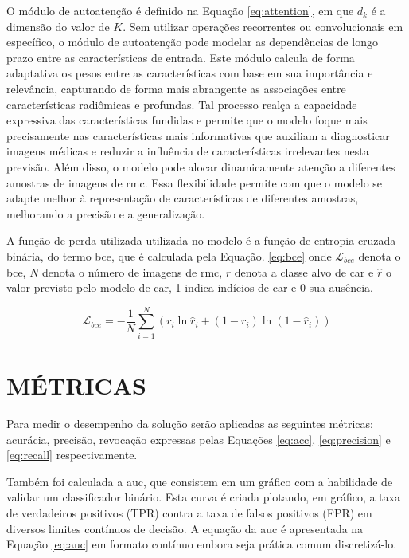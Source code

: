 O módulo de autoatenção é definido na Equação \ref{eq:attention}, em que $d_{k}$ é a dimensão do valor de $K$. Sem utilizar operações recorrentes ou convolucionais em específico, o módulo de autoatenção pode modelar as dependências de longo prazo entre as características de entrada.
Este módulo calcula de forma adaptativa os pesos entre as características com base em sua importância e relevância, capturando de forma mais abrangente as associações entre características radiômicas e profundas. Tal processo realça a capacidade expressiva das características fundidas e permite que o modelo foque mais precisamente nas características mais informativas que auxiliam a diagnosticar imagens médicas e reduzir a influência de características irrelevantes nesta previsão. Além disso, o modelo pode alocar dinamicamente atenção a diferentes amostras de imagens de \gls{rmc}. Essa flexibilidade permite com que o modelo se adapte melhor à representação de características de diferentes amostras, melhorando a precisão e a generalização.

A função de perda utilizada utilizada no modelo é a função de entropia cruzada binária, do termo  \gls{bce}, que é calculada pela Equação. \ref{eq:bce} onde $\mathcal{L}_{bce}$ denota o \gls{bce}, $N$ denota o número de imagens de \gls{rmc}, $r$ denota a classe alvo de \gls{car} e $\hat{r}$ o valor previsto pelo modelo de \gls{car}, 1 indica indícios de \gls{car} e 0 sua ausência.

\begin{equation}
\mathcal{L}_{bce} = -\frac{1}{N} \sum_{i=1}^N
(r_i \ln \hat{r}_i + (1 - r_i) \ln (1 - \hat{r}_i))
\label{eq:bce}
\end{equation}

\section{MÉTRICAS}
\label{subsec:cap4_metrics}
Para medir o desempenho da solução serão aplicadas as seguintes métricas: acurácia, precisão, revocação expressas pelas Equações \ref{eq:acc}, \ref{eq:precision} e \ref{eq:recall} respectivamente.

Também foi calculada a \gls{auc}, que consistem em um gráfico com a habilidade de validar um classificador binário. Esta curva é criada plotando, em gráfico, a taxa de verdadeiros positivos (TPR) contra a taxa de falsos positivos (FPR) em diversos limites contínuos de decisão. A equação da \gls{auc} é apresentada na Equação \ref{eq:auc} em formato contínuo embora seja prática comum discretizá-lo.


